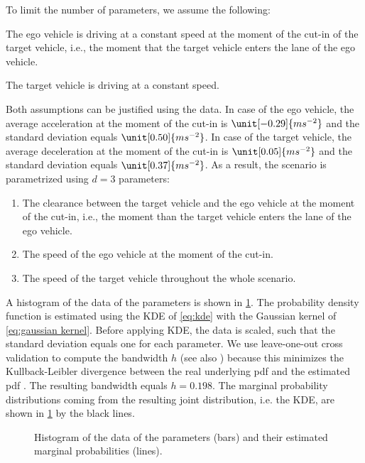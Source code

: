 To limit the number of parameters, we assume the following:
\begin{assumption}
	The ego vehicle is driving at a constant speed at the moment of the cut-in of the target vehicle, i.e., the moment that the target vehicle enters the lane of the ego vehicle.
\end{assumption}
\begin{assumption}
	The target vehicle is driving at a constant speed.
\end{assumption}
Both assumptions can be justified using the data. In case of the ego vehicle, the average acceleration at the moment of the cut-in is $\unit[-0.29]{ms^{-2}}$ and the standard deviation equals $\unit[0.50]{ms^{-2}}$. In case of the target vehicle, the average deceleration at the moment of the cut-in is $\unit[0.05]{ms^{-2}}$ and the standard deviation equals $\unit[0.37]{ms^{-2}}$. As a result, the scenario is parametrized using $d=3$ parameters:
\begin{enumerate}
	\item The clearance between the target vehicle and the ego vehicle at the moment of the cut-in, i.e., the moment than the target vehicle enters the lane of the ego vehicle.
	\item The speed of the ego vehicle at the moment of the cut-in.
	\item The speed of the target vehicle throughout the whole scenario.
\end{enumerate}


A histogram of the data of the parameters is shown in \cref{fig:histogram}. The probability density function is estimated using the KDE of \cref{eq:kde} with the Gaussian kernel of \cref{eq:gaussian kernel}. Before applying KDE, the data is scaled, such that the standard deviation equals one for each parameter. We use leave-one-out cross validation to compute the bandwidth $h$ (see also \cite{duin1976parzen}) because this minimizes the Kullback-Leibler divergence between the real underlying pdf and the estimated pdf \cite{turlach1993bandwidthselection,zambom2013review}. The resulting bandwidth equals $h=0.198$. The marginal probability distributions coming from the resulting joint distribution, i.e. the KDE, are shown in \cref{fig:histogram} by the black lines.

\setlength{}
\setlength{}
\begin{figure}
	\centering
	
	\caption{Histogram of the data of the parameters (bars) and their estimated marginal probabilities (lines).}
	\label{fig:histogram}
\end{figure}


